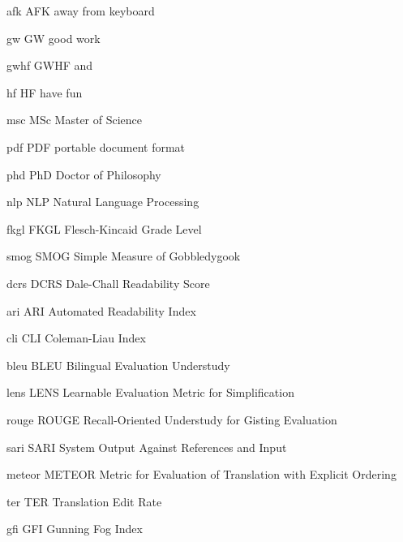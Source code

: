 \newabbreviation
{afk}
{AFK}
{away from keyboard}

\newabbreviation
{gw}
{GW}
{good work}

\newabbreviation
{gwhf}
{GWHF}
{ and }

\newabbreviation
{hf}
{HF}
{have fun}

\newabbreviation
{msc}
{MSc}
{Master of Science}

\newabbreviation
{pdf}
{PDF}
{portable document format}

\newabbreviation
{phd}
{PhD}
{Doctor of Philosophy}

\newabbreviation
{nlp}
{NLP}
{Natural Language Processing}

\newabbreviation
{fkgl}
{FKGL}
{Flesch-Kincaid Grade Level}

\newabbreviation
{smog}
{SMOG}
{Simple Measure of Gobbledygook}

\newabbreviation
{dcrs}
{DCRS}
{Dale-Chall Readability Score}

\newabbreviation
{ari}
{ARI}
{Automated Readability Index}

\newabbreviation
{cli}
{CLI}
{Coleman-Liau Index}

\newabbreviation
{bleu}
{BLEU}
{Bilingual Evaluation Understudy}

\newabbreviation
{lens}
{LENS}
{Learnable Evaluation Metric for Simplification}

\newabbreviation
{rouge}
{ROUGE}
{Recall-Oriented Understudy for Gisting Evaluation}

\newabbreviation
{sari}
{SARI}
{System Output Against References and Input}

\newabbreviation
{meteor}
{METEOR}
{Metric for Evaluation of Translation with Explicit Ordering}

\newabbreviation
{ter}
{TER}
{Translation Edit Rate}

\newabbreviation
{gfi}
{GFI}
{Gunning Fog Index}
